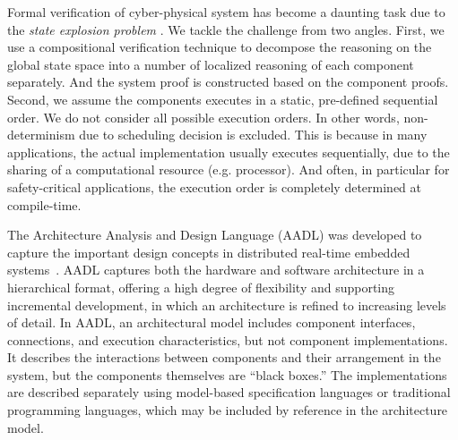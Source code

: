 
Formal verification of cyber-physical system has become a daunting task due to the \emph{state explosion problem} \cite{Clarke2012}. We tackle the challenge from two angles. First, we use a compositional verification technique to decompose the reasoning on the global state space into a number of localized reasoning of each component separately. And the system proof is constructed based on the component proofs. Second, we assume the components executes in a static, pre-defined sequential order. We do not consider all possible execution orders. In other words, non-determinism due to scheduling decision is excluded. This is because in many applications, the actual implementation usually executes sequentially, due to the sharing of a computational resource (e.g. processor). And often, in particular for safety-critical applications, the execution order is completely determined at compile-time. 

The Architecture Analysis and Design Language (AADL) was developed to capture the important design concepts in distributed real-time embedded systems~\cite{FeilerModelBasedEngineering2012}. 
AADL captures both the hardware and software architecture in a hierarchical format,  
offering a high degree of flexibility and supporting incremental development, in which an architecture is refined to increasing levels of detail.
%
In AADL, an architectural model includes component interfaces, connections, and execution characteristics, but not component implementations. It describes the interactions between components and their arrangement in the system, but the components themselves are ``black boxes.'' The implementations are described separately using model-based specification languages or traditional programming languages, which may be included by reference in the architecture model.  

